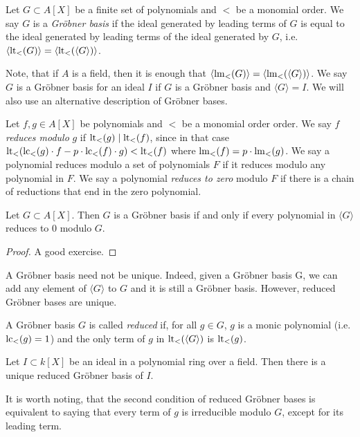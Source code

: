\begin{definition}
  Let $G \subset A[X]$ be a finite set of polynomials and $<$ be a monomial order. We say $G$ is a \textit{Gröbner basis} if the ideal generated by leading terms of $G$ is equal to the ideal generated by leading terms of the ideal generated by $G$, i.e.
  $\langle \operatorname{lt}_{<}(G) \rangle = \langle \operatorname{lt}_{<}(\langle G \rangle) \rangle$.
\end{definition}

Note, that if $A$ is a field, then it is enough that $\langle \operatorname{lm}_{<}(G) \rangle = \langle \operatorname{lm}_{<}(\langle G \rangle) \rangle$. We say $G$ is a Gröbner basis for an ideal $I$ if $G$ is a Gröbner basis and $\langle G \rangle = I$. We will also use an alternative description of Gröbner bases.

\begin{definition}
  Let $f, g \in A[X]$ be polynomials and $<$ be a monomial order order. We say $f$ \textit{reduces modulo} $g$ if $\operatorname{lt}_{<}(g) \mid \operatorname{lt}_{<}(f)$, since in that case $\operatorname{lt}_{<}(\operatorname{lc}_{<}(g)\cdot f - p\cdot \operatorname{lc}_{<}(f) \cdot g) < \operatorname{lt}_{<}(f)$ where $\operatorname{lm}_{<}(f) = p \cdot \operatorname{lm}_{<}(g)$. We say a polynomial reduces modulo a set of polynomials $F$ if it reduces modulo any polynomial in $F$. We say a polynomial \textit{reduces to zero} modulo $F$ if there is a chain of reductions that end in the zero polynomial.
\end{definition}

\begin{theorem}\label{thm:grb}
  Let $G \subset A[X]$. Then $G$ is a Gröbner basis if and only if every polynomial in $\langle G \rangle$ reduces to 0 modulo $G$.
\end{theorem}
\begin{proof}
  A good exercise.
\end{proof}

A Gröbner basis need not be unique. Indeed, given a Gröbner basis G, we can add any element of $\langle G \rangle$ to $G$ and it is still a Gröbner basis. However, reduced Gröbner bases are unique.

\begin{definition}
  A Gröbner basis $G$ is called \textit{reduced} if, for all $g \in G$, $g$ is a monic polynomial (i.e. $\operatorname{lc}_{<}(g) = 1$) and the only term of $g$ in $\operatorname{lt}_{<}(\langle G \rangle)$ is $\operatorname{lt}_{<}(g)$.
\end{definition}
\begin{theorem}
  Let $I \subset k[X]$ be an ideal in a polynomial ring over a field. Then there is a unique reduced Gröbner basis of $I$.
\end{theorem}

It is worth noting, that the second condition of reduced Gröbner bases is equivalent to saying that every term of $g$ is irreducible modulo $G$, except for its leading term.
